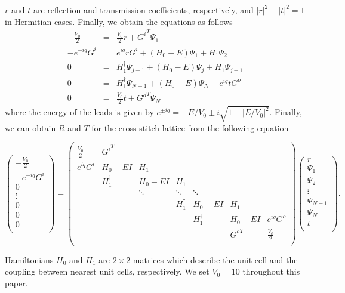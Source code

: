\documentclass[twocolumn,showpacs,epsfig,pre]{revtex4}
\begin{document}
$r$ and $t$ are reflection and transmission coefficients, respectively, and $\left|r\right|^2 + \left|t\right|^2 = 1$ in Hermitian cases.
Finally, we obtain the equations as follows
\begin{eqnarray}
 -\frac{V_0}{2} &=& \frac{V_0}{2} r + {G^i}^T \Psi_1 \\
 - e^{-i q} {G^i} &=& e^{i q} r {G^i} + (H_{0} - E) \Psi_{1} + H_{1} \Psi_{2} \\
 0 &=& H_{1}^{\dagger} \Psi_{j-1} + (H_{0} - E) \Psi_{j} + H_{1} \Psi_{j+1} \\
 0 &=& H_{1}^{\dagger} \Psi_{N-1} + (H_{0} - E) \Psi_{N} + e^{i q} t {G^o} \\
 0 &=& \frac{V_0}{2} t + {G^o}^T \Psi_N
\end{eqnarray}
where the energy of the leads is given by $e^{\pm i q} = - E / V_{0} \pm i \sqrt{1 - \left|E / V_{0}\right|^2}$.
Finally, we can obtain $R$ and $T$ for the cross-stitch lattice from the following equation
\begin{widetext}
\begin{equation}
 \left(\begin{array}{c}
 -\frac{V_0}{2} \\
 - e^{-iq} G^{i} \\
 0 \\
 \vdots \\
 0 \\
 0 \\
 0 \\
\end{array}\right)=
 \left(\begin{array}{ccccccc}
 \frac{V_0}{2} & {G^{i}}^T & & & & & \\
  e^{iq} G^{i} & H_0 - E I & H_1 & & & &  \\
  & H_1^{\dagger} & H_0 - E I & H_1 & & &  \\
  & & \ddots & \ddots & \ddots && \\
  &&& H_1^{\dagger} & H_0 - E I & H_1 & \\
  &&&& H_1^{\dagger} & H_0 - E I & e^{iq} G^{o}\\
  &&&&& {G^{o}}^T & \frac{V_0}{2} \\
\end{array}\right)
\left(\begin{array}{c}
 r \\
 \Psi_1 \\
 \Psi_2 \\
 \vdots \\
 \Psi_{N-1} \\
 \Psi_{N} \\
 t \\
\end{array}\right).
\end{equation}
\end{widetext}
Hamiltonians $H_0$ and $H_1$ are $2 \times 2$ matrices which describe the unit cell and the coupling between nearest unit cells, respectively. 
We set $V_0 = 10$ throughout this paper.
\end{document}
